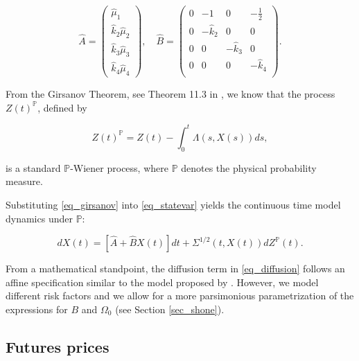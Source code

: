 \documentclass{article}
\begin{document}
\begin{equation}
   {\widehat{A}} =
\begin{pmatrix}
    \widehat{\mu}_1\\
    \widehat{k}_2 \widehat{\mu}_2 \\
    \widehat{k}_3 \widehat{\mu}_3 \\
    \widehat{k}_4 \widehat{\mu}_4
\end{pmatrix}, \quad 
{\widehat{B}} =
\begin{pmatrix}
    0 & -1 & 0 & - \frac{1}{2}\\
    0 & -\widehat{k}_2 & 0 & 0 \\
    0 & 0 & -\widehat{k}_3 & 0 \\
    0 & 0 & 0 & -\widehat{k}_4 \\
\end{pmatrix}.
\end{equation}


From the Girsanov Theorem, see Theorem 11.3 in \cite{bjork09}, we know that the process $Z(t)^\mathbb{P}$, defined by

\begin{equation} \label{eq_girsanov}
    Z(t)^\mathbb{P} = Z(t) - \int_0^t \Lambda (s,X(s)) ds,
\end{equation}

\noindent is a standard $\mathbb{P}$-Wiener process, where $\mathbb{P}$ denotes the physical probability measure.



Substituting \eqref{eq_girsanov} into \eqref{eq_statevar} yields the continuous time model dynamics under $\mathbb{P}$:

\begin{equation} \label{eq_statevar_p}
    d {X}(t) = \left[\widehat{A} + \widehat{B} {X}(t) \right] dt + {\Sigma}^{1/2}(t,X(t)) d {Z}^{\mathbb{P}}(t).
\end{equation}



From a mathematical standpoint, the diffusion term in \eqref{eq_diffusion} follows an affine specification similar to the model proposed by \cite{spinler17}. However, we model different risk factors and we allow for a more parsimonious parametrization of the expressions for \(B\) and \(\Omega_0\) (see Section \ref{sec_shone}).


\subsection{Futures prices}
\end{document}
